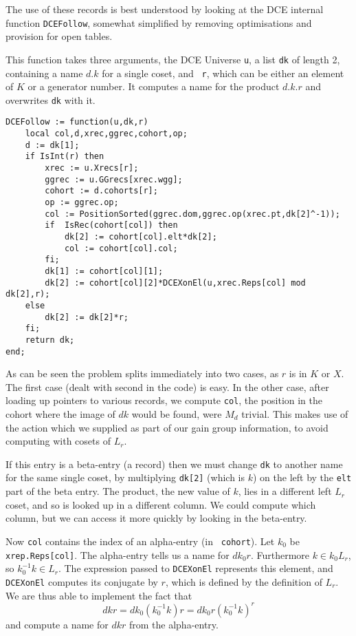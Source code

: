 The use of these records is best understood by looking at the DCE
internal function {\tt DCEFollow}, somewhat simplified by removing
optimisations and provision for open tables.

This function takes three arguments, the DCE Universe {\tt u}, a list
{\tt dk} of length 2, containing a name $d.k$ for a single coset, and {\tt
r}, which can be either an element of $K$ or a generator number. It
computes a name for the product $d.k.r$ and overwrites {\tt dk} with it.

\begin{verbatim}
DCEFollow := function(u,dk,r)
    local col,d,xrec,ggrec,cohort,op;
    d := dk[1];
    if IsInt(r) then
        xrec := u.Xrecs[r];
        ggrec := u.GGrecs[xrec.wgg];
        cohort := d.cohorts[r];
        op := ggrec.op;
        col := PositionSorted(ggrec.dom,ggrec.op(xrec.pt,dk[2]^-1));
        if  IsRec(cohort[col]) then
            dk[2] := cohort[col].elt*dk[2];
            col := cohort[col].col;
        fi;
        dk[1] := cohort[col][1];
        dk[2] := cohort[col][2]*DCEXonEl(u,xrec.Reps[col] mod dk[2],r);
    else
        dk[2] := dk[2]*r;
    fi;
    return dk;
end;
\end{verbatim}

As can be seen the problem splits immediately into two cases, as $r$
is in $K$ or $X$. The first case (dealt with second in the code) is
easy. In the other case, after loading up pointers to various
records, we compute {\tt col}, the position in the cohort where the
image of $dk$ would be found, were $M_d$ trivial. This makes use of
the action which we supplied as part of our gain group information, to
avoid computing with cosets of $L_r$.

If this entry is a beta-entry (a record) then we must change {\tt dk}
to another name for the same single coset, by multiplying {\tt dk[2]}
(which is $k$) on the left by the {\tt elt} part of the beta
entry. The product, the new
value of $k$, lies in a different left $L_r$ coset, and so is looked up
in a different column. We could compute which column, but we can access
it more quickly by looking in the beta-entry.

Now {\tt col} contains the index of an alpha-entry (in {\tt
cohort}). Let $k_0$ be {\tt xrep.Reps[col]}. The alpha-entry tells us
a name for $dk_0 r$. Furthermore $k\in k_0L_r$, so $k_0^{-1} k \in
L_r$. The expression passed to {\tt DCEXonEl} represents this element,
and {\tt DCEXonEl} computes its conjugate by $r$, which is defined by
the definition of $L_r$. We are thus able to implement the fact that
$$dkr = dk_0 (k_0^{-1}k) r = d k_0 r (k_0^{-1}k)^r$$
and compute a name for $dkr$ from the alpha-entry.

